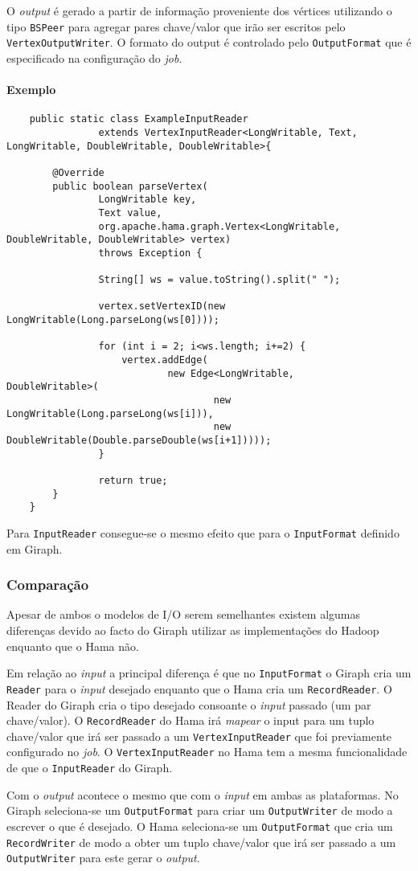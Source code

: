 O \textit{output} é gerado a partir de informação proveniente dos vértices utilizando o tipo \texttt{BSPeer} para agregar pares chave/valor que irão
ser escritos pelo \texttt{VertexOutputWriter}. O formato do output é controlado pelo \texttt{OutputFormat} que é especificado na
configuração do \textit{job}.

\paragraph{Exemplo}
\begin{verbatim}
 	public static class ExampleInputReader 
				extends VertexInputReader<LongWritable, Text, 
LongWritable, DoubleWritable, DoubleWritable>{

		@Override
		public boolean parseVertex(
				LongWritable key,
				Text value,
				org.apache.hama.graph.Vertex<LongWritable, 
DoubleWritable, DoubleWritable> vertex)
				throws Exception {

				String[] ws = value.toString().split(" ");

				vertex.setVertexID(new 
LongWritable(Long.parseLong(ws[0])));
				
				for (int i = 2; i<ws.length; i+=2) {
					vertex.addEdge(
							new Edge<LongWritable, 
DoubleWritable>(
									new 
LongWritable(Long.parseLong(ws[i])),
									new 
DoubleWritable(Double.parseDouble(ws[i+1]))));
				}

				return true;
		}
	}
\end{verbatim}

Para \texttt{InputReader} consegue-se o mesmo efeito que para o 
\texttt{InputFormat} definido em Giraph.

\subsubsection*{Comparação}

Apesar de ambos o modelos de I/O serem semelhantes existem algumas diferenças devido ao facto do Giraph utilizar as implementações 
do Hadoop enquanto que o Hama não. 

Em relação ao \textit{input} a principal diferença é que no \texttt{InputFormat} o Giraph cria um \texttt{Reader} para o \textit{input} desejado enquanto que 
o Hama cria um \texttt{RecordReader}. O Reader do Giraph cria o tipo desejado consoante o \textit{input} passado (um par chave/valor). O \texttt{RecordReader}
do Hama irá \textit{mapear} o input para um tuplo chave/valor que irá ser passado a um \texttt{VertexInputReader} que foi previamente configurado no \textit{job}. O \texttt{VertexInputReader}
no Hama tem a mesma funcionalidade de que o \texttt{InputReader} do Giraph.

Com o \textit{output} acontece o mesmo que com o \textit{input} em ambas as plataformas. No Giraph seleciona-se um \texttt{OutputFormat} para criar um \texttt{OutputWriter} de modo
a escrever o que é desejado. O Hama seleciona-se um \texttt{OutputFormat} que cria um \texttt{RecordWriter} de modo a obter um tuplo chave/valor que irá ser
passado a um \texttt{OutputWriter} para este gerar o \textit{output}.